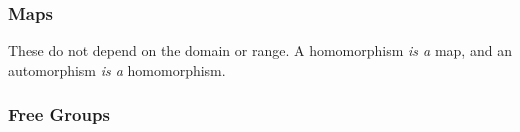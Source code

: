 
\subsubsection{Maps}

These do not depend on the domain or range. A homomorphism {\em is a} map, and
an automorphism {\em is a} homomorphism.

\begin{enumerate}





\end{enumerate}


\subsubsection{Free Groups}


